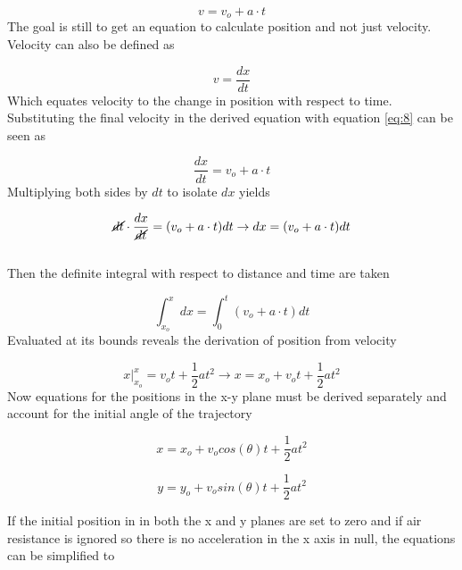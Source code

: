 \documentclass{article}
\begin{document}
\begin{equation}
\label{eq:7}
\boxed{v = v_o + a \cdot t}
\end{equation}
The goal is still to get an equation to calculate position and not just velocity. Velocity can also be defined as

\begin{equation}
\label{eq:8}
v = \dfrac{dx}{dt}
\end{equation}
Which equates velocity to the change in position with respect to time. Substituting the final velocity in the derived equation with equation \ref{eq:8} can be seen as

\begin{equation}
\label{eq:9}
\dfrac{dx}{dt} =  v_o + a \cdot t
\end{equation}
Multiplying both sides by $dt$ to isolate $dx$ yields

\begin{equation}
\label{eq:10}
\cancel{dt} \cdot \dfrac{dx}{\cancel{dt}} =  (v_o + a \cdot t) dt \rightarrow dx =  (v_o + a \cdot t) dt
\end{equation}\\
\noindent
Then the definite integral with respect to distance and time are taken

\begin{equation}
\label{eq:11}
\int_{x_o}^{x} dx = \int_{0}^{t} (v_o + a \cdot t) dt
\end{equation}
Evaluated at its bounds reveals the derivation of position from velocity

\begin{equation}
\label{eq:12}
x\Big|_{x_o}^{x} = v_o t + \dfrac{1}{2}at^2 \rightarrow \boxed{x = x_o + v_o  t + \dfrac{1}{2}at^2}
\end{equation}
Now equations for the positions in the x-y plane must be derived separately and account for the initial angle of the trajectory

\begin{equation}
\label{eq:13}
x = x_o +  v_o  cos(\theta) t + \dfrac{1}{2}at^2
\end{equation}

\begin{equation}
\label{eq:14}
y = y_o + v_o  sin(\theta) t + \dfrac{1}{2}at^2
\end{equation}

If the initial position in in both the x and y planes are set to zero and if air resistance is ignored so there is no acceleration in the x axis in null, the equations can be simplified to
\end{document}

